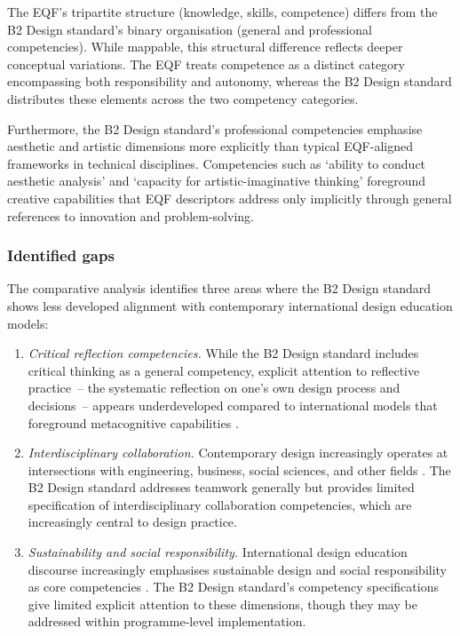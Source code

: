\documentclass[ed]{acnsart}
\begin{document}
	The EQF's tripartite structure (knowledge, skills, competence) differs from the B2 Design standard's binary organisation (general and professional competencies). While mappable, this structural difference reflects deeper conceptual variations. The EQF treats competence as a distinct category encompassing both responsibility and autonomy, whereas the B2 Design standard distributes these elements across the two competency categories.
	
	Furthermore, the B2 Design standard's professional competencies emphasise aesthetic and artistic dimensions more explicitly than typical EQF-aligned frameworks in technical disciplines. Competencies such as `ability to conduct aesthetic analysis' and `capacity for artistic-imaginative thinking' foreground creative capabilities that EQF descriptors address only implicitly through general references to innovation and problem-solving.
	
	\subsubsection{Identified gaps}
	
	The comparative analysis identifies three areas where the B2 Design standard shows less developed alignment with contemporary international design education models:
	
	\begin{enumerate}
		\item 
		\textit{Critical reflection competencies.} While the B2 Design standard includes critical thinking as a general competency, explicit attention to reflective practice~-- the systematic reflection on one's own design process and decisions~-- appears underdeveloped compared to international models that foreground metacognitive capabilities \cite{Schon1983, Hameed2023310}.
		
		\item 
		\textit{Interdisciplinary collaboration.} Contemporary design increasingly operates at intersections with engineering, business, social sciences, and other fields \cite{Davis202397}. The B2 Design standard addresses teamwork generally but provides limited specification of interdisciplinary collaboration competencies, which are increasingly central to design practice.
		
		\item 
		\textit{Sustainability and social responsibility.} International design education discourse increasingly emphasises sustainable design and social responsibility as core competencies \cite{Maia2022105}. The B2 Design standard's competency specifications give limited explicit attention to these dimensions, though they may be addressed within programme-level implementation.
	\end{enumerate}
	
\end{document}

